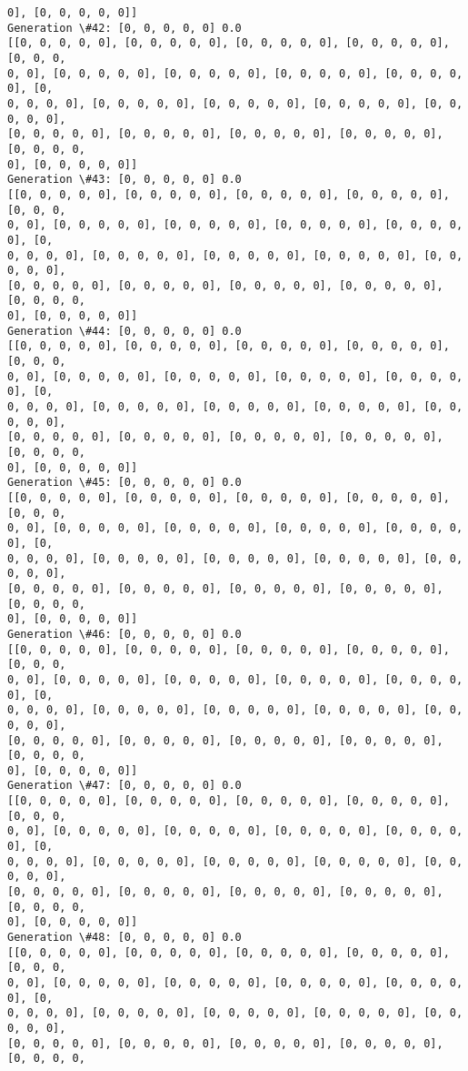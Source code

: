 \documentclass[11pt]{article}
\begin{document}
\begin{Verbatim}[commandchars=\\\{\}]
0], [0, 0, 0, 0, 0]]
Generation \#42: [0, 0, 0, 0, 0] 0.0
[[0, 0, 0, 0, 0], [0, 0, 0, 0, 0], [0, 0, 0, 0, 0], [0, 0, 0, 0, 0], [0, 0, 0,
0, 0], [0, 0, 0, 0, 0], [0, 0, 0, 0, 0], [0, 0, 0, 0, 0], [0, 0, 0, 0, 0], [0,
0, 0, 0, 0], [0, 0, 0, 0, 0], [0, 0, 0, 0, 0], [0, 0, 0, 0, 0], [0, 0, 0, 0, 0],
[0, 0, 0, 0, 0], [0, 0, 0, 0, 0], [0, 0, 0, 0, 0], [0, 0, 0, 0, 0], [0, 0, 0, 0,
0], [0, 0, 0, 0, 0]]
Generation \#43: [0, 0, 0, 0, 0] 0.0
[[0, 0, 0, 0, 0], [0, 0, 0, 0, 0], [0, 0, 0, 0, 0], [0, 0, 0, 0, 0], [0, 0, 0,
0, 0], [0, 0, 0, 0, 0], [0, 0, 0, 0, 0], [0, 0, 0, 0, 0], [0, 0, 0, 0, 0], [0,
0, 0, 0, 0], [0, 0, 0, 0, 0], [0, 0, 0, 0, 0], [0, 0, 0, 0, 0], [0, 0, 0, 0, 0],
[0, 0, 0, 0, 0], [0, 0, 0, 0, 0], [0, 0, 0, 0, 0], [0, 0, 0, 0, 0], [0, 0, 0, 0,
0], [0, 0, 0, 0, 0]]
Generation \#44: [0, 0, 0, 0, 0] 0.0
[[0, 0, 0, 0, 0], [0, 0, 0, 0, 0], [0, 0, 0, 0, 0], [0, 0, 0, 0, 0], [0, 0, 0,
0, 0], [0, 0, 0, 0, 0], [0, 0, 0, 0, 0], [0, 0, 0, 0, 0], [0, 0, 0, 0, 0], [0,
0, 0, 0, 0], [0, 0, 0, 0, 0], [0, 0, 0, 0, 0], [0, 0, 0, 0, 0], [0, 0, 0, 0, 0],
[0, 0, 0, 0, 0], [0, 0, 0, 0, 0], [0, 0, 0, 0, 0], [0, 0, 0, 0, 0], [0, 0, 0, 0,
0], [0, 0, 0, 0, 0]]
Generation \#45: [0, 0, 0, 0, 0] 0.0
[[0, 0, 0, 0, 0], [0, 0, 0, 0, 0], [0, 0, 0, 0, 0], [0, 0, 0, 0, 0], [0, 0, 0,
0, 0], [0, 0, 0, 0, 0], [0, 0, 0, 0, 0], [0, 0, 0, 0, 0], [0, 0, 0, 0, 0], [0,
0, 0, 0, 0], [0, 0, 0, 0, 0], [0, 0, 0, 0, 0], [0, 0, 0, 0, 0], [0, 0, 0, 0, 0],
[0, 0, 0, 0, 0], [0, 0, 0, 0, 0], [0, 0, 0, 0, 0], [0, 0, 0, 0, 0], [0, 0, 0, 0,
0], [0, 0, 0, 0, 0]]
Generation \#46: [0, 0, 0, 0, 0] 0.0
[[0, 0, 0, 0, 0], [0, 0, 0, 0, 0], [0, 0, 0, 0, 0], [0, 0, 0, 0, 0], [0, 0, 0,
0, 0], [0, 0, 0, 0, 0], [0, 0, 0, 0, 0], [0, 0, 0, 0, 0], [0, 0, 0, 0, 0], [0,
0, 0, 0, 0], [0, 0, 0, 0, 0], [0, 0, 0, 0, 0], [0, 0, 0, 0, 0], [0, 0, 0, 0, 0],
[0, 0, 0, 0, 0], [0, 0, 0, 0, 0], [0, 0, 0, 0, 0], [0, 0, 0, 0, 0], [0, 0, 0, 0,
0], [0, 0, 0, 0, 0]]
Generation \#47: [0, 0, 0, 0, 0] 0.0
[[0, 0, 0, 0, 0], [0, 0, 0, 0, 0], [0, 0, 0, 0, 0], [0, 0, 0, 0, 0], [0, 0, 0,
0, 0], [0, 0, 0, 0, 0], [0, 0, 0, 0, 0], [0, 0, 0, 0, 0], [0, 0, 0, 0, 0], [0,
0, 0, 0, 0], [0, 0, 0, 0, 0], [0, 0, 0, 0, 0], [0, 0, 0, 0, 0], [0, 0, 0, 0, 0],
[0, 0, 0, 0, 0], [0, 0, 0, 0, 0], [0, 0, 0, 0, 0], [0, 0, 0, 0, 0], [0, 0, 0, 0,
0], [0, 0, 0, 0, 0]]
Generation \#48: [0, 0, 0, 0, 0] 0.0
[[0, 0, 0, 0, 0], [0, 0, 0, 0, 0], [0, 0, 0, 0, 0], [0, 0, 0, 0, 0], [0, 0, 0,
0, 0], [0, 0, 0, 0, 0], [0, 0, 0, 0, 0], [0, 0, 0, 0, 0], [0, 0, 0, 0, 0], [0,
0, 0, 0, 0], [0, 0, 0, 0, 0], [0, 0, 0, 0, 0], [0, 0, 0, 0, 0], [0, 0, 0, 0, 0],
[0, 0, 0, 0, 0], [0, 0, 0, 0, 0], [0, 0, 0, 0, 0], [0, 0, 0, 0, 0], [0, 0, 0, 0,

\end{Verbatim}
\end{document}
